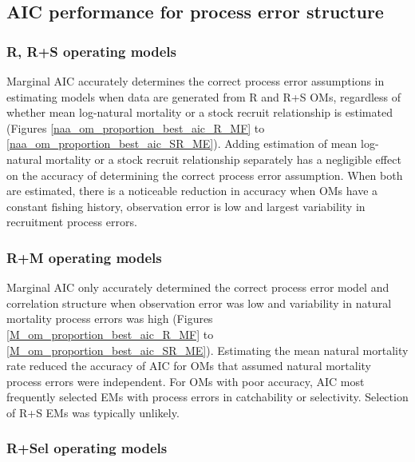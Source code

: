 \documentclass[
  12pt,
]{article}
\begin{document}
\hypertarget{aic-performance-for-process-error-structure}{%
\subsection*{AIC performance for process error
structure}\label{aic-performance-for-process-error-structure}}

\hypertarget{r-rs-operating-models-1}{%
\subsubsection*{R, R+S operating models}\label{r-rs-operating-models-1}}

Marginal AIC accurately determines the correct process error assumptions
in estimating models when data are generated from R and R+S OMs,
regardless of whether mean log-natural mortality or a stock recruit
relationship is estimated (Figures \ref{naa_om_proportion_best_aic_R_MF}
to \ref{naa_om_proportion_best_aic_SR_ME}). Adding estimation of mean
log-natural mortality or a stock recruit relationship separately has a
negligible effect on the accuracy of determining the correct process
error assumption. When both are estimated, there is a noticeable
reduction in accuracy when OMs have a constant fishing history,
observation error is low and largest variability in recruitment process
errors.

\hypertarget{rm-operating-models-1}{%
\subsubsection*{R+M operating models}\label{rm-operating-models-1}}

Marginal AIC only accurately determined the correct process error model
and correlation structure when observation error was low and variability
in natural mortality process errors was high (Figures
\ref{M_om_proportion_best_aic_R_MF} to
\ref{M_om_proportion_best_aic_SR_ME}). Estimating the mean natural
mortality rate reduced the accuracy of AIC for OMs that assumed natural
mortality process errors were independent. For OMs with poor accuracy,
AIC most frequently selected EMs with process errors in catchability or
selectivity. Selection of R+S EMs was typically unlikely.

\hypertarget{rsel-operating-models-1}{%
\subsubsection*{R+Sel operating models}\label{rsel-operating-models-1}}
\end{document}
